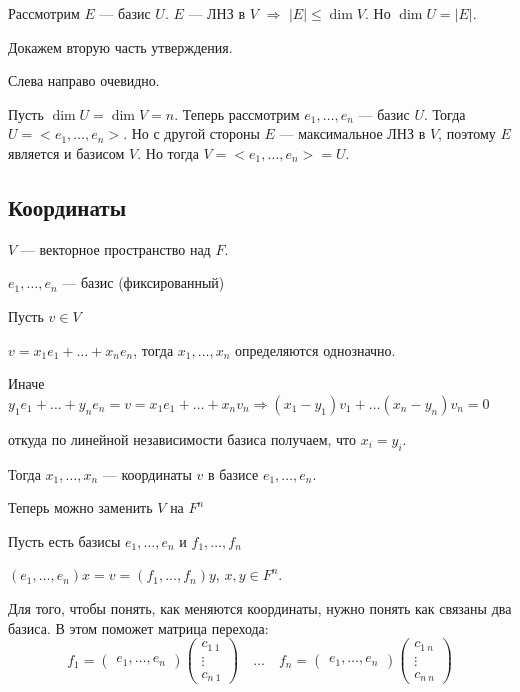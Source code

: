 Рассмотрим \( E \) --- базис \( U \).
\( E \) --- ЛНЗ в \( V \) \( \Rightarrow \) \( |E| \leq \dim V \).
Но \( \dim U = |E| \).

Докажем вторую часть утверждения.

Слева направо очевидно.

Пусть \( \dim U = \dim V = n \).
Теперь рассмотрим \( e_1, \ldots, e_n \) --- базис \( U \).
Тогда \( U = < e_1, \ldots, e_n > \).
Но с другой стороны \( E \) --- максимальное ЛНЗ в \( V \), поэтому \( E \) является и базисом \( V \).
Но тогда \( V = < e_1, \ldots, e_n > = U \).

\newpage

\subsection{Координаты}

\( V \) --- векторное пространство над \( F \).

\( e_1, \ldots, e_n \) --- базис (фиксированный)

Пусть \( v \in V \)

\( v = x_1 e_1 + \ldots + x_n e_n \), тогда \( x_1, \ldots, x_n \) определяются однозначно.

Иначе
\(
    y_1 e_1 + \ldots + y_n e_n = v = x_1 e_1 + \ldots + x_n v_n \Rightarrow (x_1 - y_1) v_1 + \ldots (x_n - y_n) v_n = 0
\)

откуда по линейной независимости базиса получаем, что \( x_i = y_i \).

Тогда \( x_1, \ldots, x_n \) --- координаты \( v \) в базисе \( e_1, \ldots, e_n \).

Теперь можно заменить \( V \) на \( F^n \)

Пусть есть базисы \( e_1, \ldots, e_n \) и \( f_1, \ldots, f_n \)

\( (e_1, \ldots, e_n) x = v = (f_1, \ldots, f_n) y \), \( x, y \in F^n \).

Для того, чтобы понять, как меняются координаты, нужно понять как связаны два базиса.
В этом поможет матрица перехода:
\[
    f_1
    =
    \begin{pmatrix}
        e_1, \ldots, e_n
    \end{pmatrix}
    \begin{pmatrix}
        c_{1 \: 1}
        \\
        \vdots
        \\
        c_{n \: 1}
    \end{pmatrix}
    \quad \ldots \quad
    f_n
    =
    \begin{pmatrix}
        e_1, \ldots, e_n
    \end{pmatrix}
    \begin{pmatrix}
        c_{1 \: n}
        \\
        \vdots
        \\
        c_{n \: n}
    \end{pmatrix}
\]

